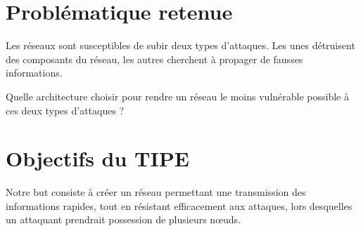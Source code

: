 \documentclass[11pt,a4paper]{article}
\begin{document}
\section{Problématique retenue}




	Les réseaux sont susceptibles de subir deux types d'attaques. Les unes détruisent des composants du réseau, les autres cherchent à propager de fausses informations. 
	
	Quelle architecture choisir pour rendre un réseau le moins vulnérable possible à ces deux types d'attaques ?   
%
%	
%	

\section{Objectifs du TIPE}


Notre but consiste à créer un réseau permettant une transmission des informations rapides, tout en résistant efficacement aux attaques, lors desquelles un attaquant prendrait possession de plusieurs n{\oe}uds.



%	
%	  
%	



 
\end{document}
